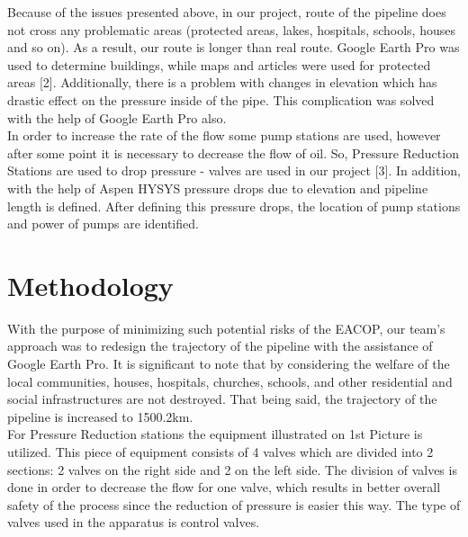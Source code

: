 \documentclass[12pt]{article}
\begin{document}
{\fontsize{12pt}{12pt}\selectfont  
\hspace*{1em} Because of the issues presented above, in our project, route of the pipeline does not cross any problematic areas (protected areas, lakes, hospitals, schools, houses and so on). As a result, our route is longer than real route. Google Earth Pro was used to determine buildings, while maps and articles were used for protected areas [2]. Additionally, there is a problem with changes in elevation which has drastic effect on the pressure inside of the pipe. This complication was solved with the help of Google Earth Pro also.
\\

In order to increase the rate of the flow some pump stations are used, however after some point it is necessary to decrease the flow of oil. So, Pressure Reduction Stations are used to drop pressure - valves are used in our project [3].  In addition, with the help of Aspen HYSYS pressure drops due to elevation and pipeline length is defined. After defining this pressure drops, the location of pump stations and power of pumps are identified.
\\

}

\section{Methodology}

{\fontsize{12pt}{12pt}\selectfont  
\hspace*{1em} With the purpose of minimizing such potential risks of the EACOP, our team's approach was to redesign the trajectory of the pipeline with the assistance of Google Earth Pro. It is significant to note that by considering the welfare of the local communities, houses, hospitals, churches, schools, and other residential and social infrastructures are not destroyed. That being said, the trajectory of the pipeline is increased to 1500.2km. 
\\

For Pressure Reduction stations the equipment illustrated on 1st Picture is utilized. This piece of equipment consists of 4 valves which are divided into 2 sections: 2 valves on the right side and 2 on the left side. The division of valves is done in order to decrease the flow for one valve, which results in better overall safety of the process since the reduction of pressure is easier this way. The type of valves used in the apparatus is control valves.
\\




}
\end{document}
